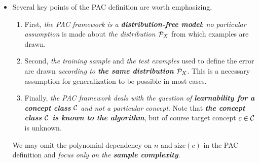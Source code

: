 \documentclass[11pt]{article}
\begin{document}
\begin{itemize}
\item \begin{remark}
Several key points of the PAC definition are worth emphasizing. 
\begin{enumerate}
\item First, \emph{the PAC framework is a \textbf{distribution-free model}}: \emph{no particular assumption} is made about \emph{the distribution ${\mathcal P}_{X}$} from which examples are drawn. 

\item Second, \emph{the training sample} and \emph{the test examples} used to define the error are drawn \emph{according to \textbf{the same distribution} ${\mathcal P}_{X}$}. This is a necessary assumption for generalization to be possible in most cases.

\item Finally, \emph{the PAC framework deals with the question of \textbf{learnability for a concept class} ${\mathcal C}$ and not a particular concept}. Note that \emph{\textbf{the concept class ${\mathcal C}$ is known to the algorithm}}, but of course target concept $c \in {\mathcal C}$ is unknown.
\end{enumerate}
We may omit the polynomial dependency on $n$ and $\text{size}(c)$ in the PAC definition and \emph{focus only on the \textbf{sample complexity}}.
\end{remark}
\end{itemize}
\end{document}
